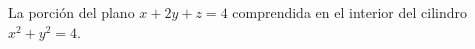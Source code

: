 \item La porción del plano $x + 2y + z = 4$ comprendida en el interior del cilindro $x^2 + y^2 = 4$.
